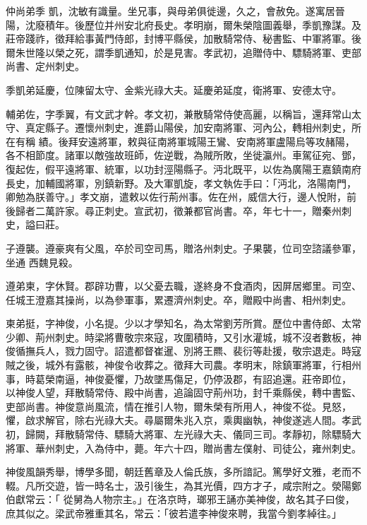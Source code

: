 \begin{pinyinscope}
 仲尚弟季
 凱，沈敏有識量。坐兄事，與母弟俱徙邊，久之，會赦免。遂寓居晉陽，沈廢積年。後歷位并州安北府長史。孝明崩，爾朱榮陰圖義舉，季凱豫謀。及莊帝踐祚，徵拜給事黃門侍郎，封博平縣侯，加散騎常侍、秘書監、中軍將軍。後爾朱世隆以榮之死，謂季凱通知，於是見害。孝武初，追贈侍中、驃騎將軍、吏部尚書、定州刺史。



 季凱弟延慶，位陳留太守、金紫光祿大夫。延慶弟延度，衛將軍、安德太守。



 輔弟佐，字季翼，有文武才幹。孝文初，兼散騎常侍使高麗，以稱旨，還拜常山太守、真定縣子。遷懷州刺史，進爵山陽侯，加安南將軍、河內公，轉相州刺史，所在有稱
 績。後拜安遠將軍，敕與征南將軍城陽王鸞、安南將軍盧陽烏等攻赭陽，各不相節度。諸軍以敵強故班師，佐逆戰，為賊所敗，坐徙瀛州。車駕征宛、鄧，復起佐，假平遠將軍、統軍，以功封涇陽縣子。沔北既平，以佐為廣陽王嘉鎮南府長史，加輔國將軍，別鎮新野。及大軍凱旋，孝文執佐手曰：「沔北，洛陽南門，卿勉為朕善守。」孝文崩，遣敕以佐行荊州事。佐在州，威信大行，邊人悅附，前後歸者二萬許家。尋正刺史。宣武初，徵兼都官尚書。卒，年七十一，贈秦州刺史，謚曰莊。



 子遵襲。遵豪爽有父風，卒於司空司馬，贈洛州刺史。子果襲，位司空諮議參軍，坐通
 西魏見殺。



 遵弟柬，字休賢。郡辟功曹，以父憂去職，遂終身不食酒肉，因屏居鄉里。司空、任城王澄嘉其操尚，以為參軍事，累遷濟州刺史。卒，贈殿中尚書、相州刺史。



 柬弟挺，字神俊，小名提。少以才學知名，為太常劉芳所賞。歷位中書侍郎、太常少卿、荊州刺史。時梁將曹敬宗來寇，攻圍積時，又引水灌城，城不沒者數板，神俊循撫兵人，戮力固守。詔遣都督崔暹、別將王羆、裴衍等赴援，敬宗退走。時寇賊之後，城外有露骸，神俊令收葬之。徵拜大司農。孝明末，除鎮軍將軍，行相州事，時葛榮南逼，神俊憂懼，乃故墜馬傷足，仍停汲郡，有詔追還。莊帝即位，
 以神俊人望，拜散騎常侍、殿中尚書，追論固守荊州功，封千乘縣侯，轉中書監、吏部尚書。神俊意尚風流，情在推引人物，爾朱榮有所用人，神俊不從。見怒，懼，啟求解官，除右光祿大夫。尋屬爾朱兆入京，乘輿幽執，神俊遂逃人間。孝武初，歸闕，拜散騎常侍、驃騎大將軍、左光祿大夫、儀同三司。孝靜初，除驃騎大將軍、華州刺史，入為侍中，薨。年六十四，贈尚書左僕射、司徒公，雍州刺史。



 神俊風韻秀舉，博學多聞，朝廷舊章及人倫氏族，多所諳記。篤學好文雅，老而不輟。凡所交遊，皆一時名士，汲引後生，為其光價，四方才子，咸宗附之。滎陽鄭伯獻常云：「
 從舅為人物宗主。」在洛京時，瑯邪王誦亦美神俊，故名其子曰俊，庶其似之。梁武帝雅重其名，常云：「彼若遣李神俊來聘，我當今劉孝綽往。」




\end{pinyinscope}
